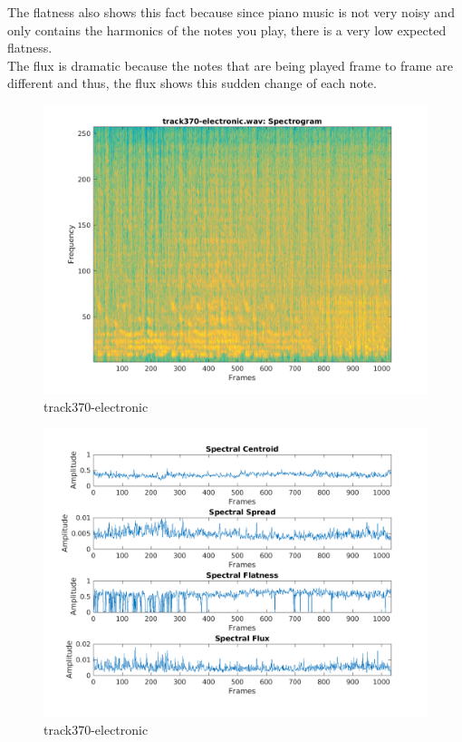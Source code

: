 \documentclass[11pt, a4paper]{article}
\begin{document}
The flatness also shows this fact because since piano music is not very noisy and only contains the harmonics of the notes you play, there is a very low expected flatness. \\

The flux is dramatic because the notes that are being played frame to frame are different and thus, the flux shows this sudden change of each note. 

\pagebreak

\begin{figure}[H]
    \centering
    \includegraphics[width=.75\textwidth]{track370-electronic-specto.png}
    \caption{track370-electronic}
\end{figure}

\begin{figure}[H]
    \centering
    \includegraphics[width=1\textwidth]{track370-electronic-spectral.png}
    \caption{track370-electronic}
\end{figure}
\end{document}
